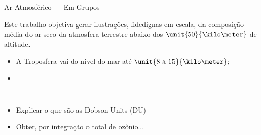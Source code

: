     \begin{frame}[allowframebreaks]{Ar Atmosférico --- Em Grupos}\vspace*{-0em}
        
        Este trabalho objetiva gerar \alert{ilustrações}, \alert{fidedignas em escala}, da
        composição média do \alert{ar seco} da atmosfera terrestre abaixo dos
        \alert{$\unit{50}{\kilo\meter}$ de altitude}.

        \begin{itemize}
            \item A \alert{Troposfera} vai do nível do mar até $\unit{8\mbox{ a }15}%
                {\kilo\meter}$;
            \item
        \end{itemize}

        \pagebreak

        \begin{columns}
            \begin{itemize}
                \item<1-> Explicar o que são as Dobson Units (DU)
                \item<1-> Obter, por integração o total de ozônio...
            \end{itemize}
        \end{columns}

    \end{frame}




